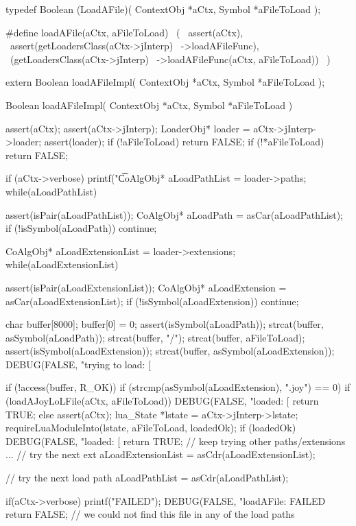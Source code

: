\startCHeader
typedef Boolean (LoadAFile)(
  ContextObj *aCtx,
  Symbol     *aFileToLoad
);

#define loadAFile(aCtx, aFileToLoad)       \
  (                                        \
    assert(aCtx),                          \
    assert(getLoadersClass(aCtx->jInterp)  \
      ->loadAFileFunc),                    \
    (getLoadersClass(aCtx->jInterp)        \
      ->loadAFileFunc(aCtx, aFileToLoad))  \
  )
\stopCHeader

\setCHeaderStream{private}
\startCHeader
extern Boolean loadAFileImpl(
  ContextObj *aCtx,
  Symbol     *aFileToLoad
);
\stopCHeader
\setCHeaderStream{public}

\startCCode
Boolean loadAFileImpl(
  ContextObj *aCtx,
  Symbol     *aFileToLoad
) {
  assert(aCtx);
  assert(aCtx->jInterp);
  LoaderObj* loader = aCtx->jInterp->loader;
  assert(loader);
  if (!aFileToLoad) return FALSE;
  if (!*aFileToLoad) return FALSE;

  if (aCtx->verbose) printf("\t%

  CoAlgObj* aLoadPathList = loader->paths;
  while(aLoadPathList) {
    assert(isPair(aLoadPathList));
    CoAlgObj* aLoadPath = asCar(aLoadPathList);
    if (!isSymbol(aLoadPath)) continue;

    CoAlgObj* aLoadExtensionList = loader->extensions;
    while(aLoadExtensionList) {
      assert(isPair(aLoadExtensionList));
      CoAlgObj* aLoadExtension = asCar(aLoadExtensionList);
      if (!isSymbol(aLoadExtension)) continue;

      char buffer[8000];
      buffer[0] = 0;
      assert(isSymbol(aLoadPath));
      strcat(buffer, asSymbol(aLoadPath));
      strcat(buffer, "/");
      strcat(buffer, aFileToLoad);
      assert(isSymbol(aLoadExtension));
      strcat(buffer, asSymbol(aLoadExtension));
      DEBUG(FALSE, "trying to load: [%

      if (!access(buffer, R_OK)) {
        if (strcmp(asSymbol(aLoadExtension), ".joy") == 0) {
          if (loadAJoyLoLFile(aCtx, aFileToLoad)) {
            DEBUG(FALSE, "loaded: [%
            return TRUE;
          }
        } else {
          assert(aCtx);
          lua_State *lstate = aCtx->jInterp->lstate;
          requireLuaModuleInto(lstate, aFileToLoad, loadedOk);
          if (loadedOk) {
            DEBUG(FALSE, "loaded: [%
            return TRUE;
          }
        }
        // keep trying other paths/extensions ...
      }
      // try the next ext
      aLoadExtensionList = asCdr(aLoadExtensionList);
    }
    // try the next load path
    aLoadPathList = asCdr(aLoadPathList);
  }
  if(aCtx->verbose) printf("FAILED\n");
  DEBUG(FALSE, "loadAFile: FAILED%
  return FALSE; // we could not find this file in any of the load paths
}
\stopCCode

